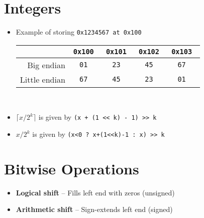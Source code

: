 \section{Integers}
\begin{itemize}[noitemsep, topsep=1pt]
    \item Example of storing \tt{0x1234567} at \tt{0x100} \\
    \begin{tabular}{| r || c | c | c | c |}
        \hline
                      & \tt{0x100} & \tt{0x101} & \tt{0x102} & \tt{0x103} \\ \hline
        Big endian    & \tt{01}    & \tt{23}    & \tt{45}    & \tt{67}    \\ \hline
        Little endian & \tt{67}    & \tt{45}    & \tt{23}    & \tt{01}    \\ \hline
    \end{tabular} \\
    \item $\lceil x/2^k \rceil$ is given by \tt{(x + (1 << k) - 1) >> k}
    \item $x/2^k$ is given by \tt{(x<0 ? x+(1<<k)-1 : x) >> k}
\end{itemize}
\vspace{-20pt}
\section{Bitwise Operations}
\begin{itemize}[noitemsep, topsep=1pt]
\item \textbf{Logical shift} -- Fills left end with zeros (unsigned)
\item \textbf{Arithmetic shift} -- Sign-extends left end (signed)
\end{itemize}
\vspace{-20pt}

